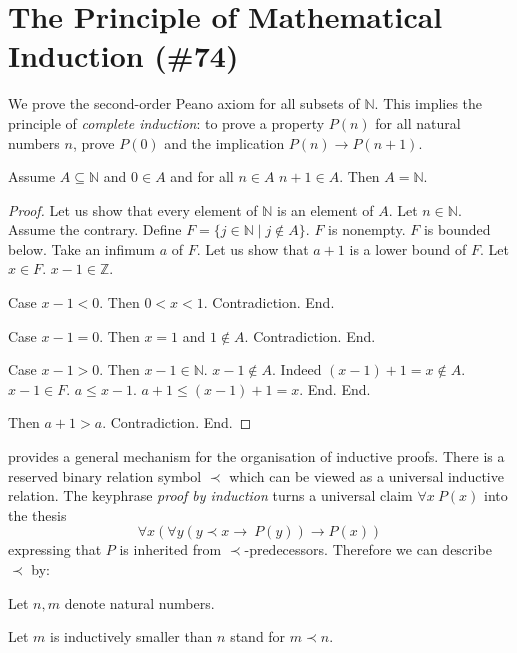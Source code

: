 \documentclass{article}
\begin{document}
\section{The Principle of Mathematical Induction (\#74)}

We prove the second-order Peano axiom for all subsets of $\mathbb{N}$.
This implies the principle of {\em complete induction}: to prove a
property $P(n)$ for all natural numbers $n$, prove $P(0)$ and
the implication $P(n) \rightarrow P(n+1)$.
%
\begin{forthel}

\begin{theorem}[title=Induction Theorem]
Assume $A \subseteq \mathbb{N}$
and $0 \in A$ and for all $n \in A$ $n + 1 \in A$.
Then $A = \mathbb{N}$.
\end{theorem}

\begin{proof}
Let us show that every element of $\mathbb{N}$ is an element of $A$.
  Let $n \in \mathbb{N}$.
  Assume the contrary.
  Define $F = \{  j \in \mathbb{N} \mid j \notin A\}$.
  $F$ is nonempty. $F$ is bounded below.
  Take an infimum $a$ of $F$.
  Let us show that $a+1$ is a lower bound of $F$.
    Let $x \in F$. $x - 1 \in \mathbb{Z}$.

    Case $x - 1 < 0$. Then $0 < x < 1$. Contradiction. End.

    Case $x - 1 = 0$. Then $x = 1$ and $1 \notin A$. Contradiction. End.

    Case $x - 1 > 0$. Then $x - 1 \in \mathbb{N}$.
      $x - 1 \notin A$. Indeed $(x - 1) + 1 = x \notin A$. $x - 1 \in F$.
      $a \leq x - 1$.
      $a + 1 \leq (x - 1) + 1 = x$.
    End.
  End.

  Then $a+1 > a$.
  Contradiction.
End.
\end{proof}
\end{forthel}
%
\Naproche provides a general mechanism for the organisation of
inductive proofs. There is a reserved binary relation
symbol $\prec$ which can be viewed as a universal inductive relation.
The keyphrase {\em proof by induction} turns a universal
claim $\forall x \ P(x)$ into the thesis
$$\forall x (\forall y (y \prec x \rightarrow \ P(y)) \rightarrow P(x))$$
expressing that $P$ is inherited from $\prec$-predecessors.
Therefore we can describe $\prec$ by:
%
\begin{forthel}
Let $n,m$ denote natural numbers.

Let $m$ is inductively smaller than $n$ stand for $m \prec n$.
\end{forthel}
\end{document}
